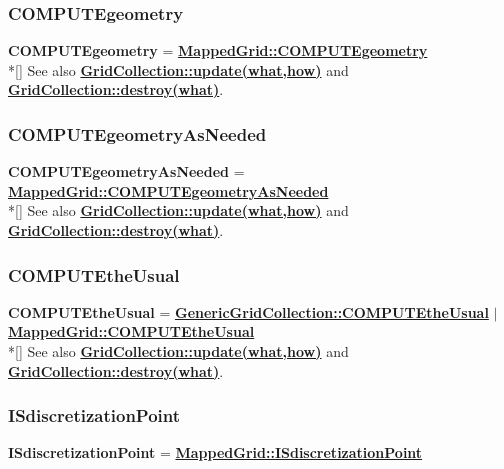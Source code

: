 \documentclass{article}
\begin{document}
  \subsubsection{COMPUTEgeometry}
  \label{GridCollection::COMPUTEgeometry}
    \textbf{COMPUTEgeometry} =
    {\bf{}\hyperref{MappedGrid::COMPUTEgeometry}{MappedGrid::COMPUTEgeometry \rm(\S}{)}{MappedGrid::COMPUTEgeometry}} \\*[\parskip]
    See also {\bf{}\hyperref{update(what,how)}{update(what,how) \rm(\S}{)}{GridCollection::update(what,how)}}
    and {\bf{}\hyperref{destroy(what)}{destroy(what) \rm(\S}{)}{GridCollection::destroy(what)}}.

  \subsubsection{COMPUTEgeometryAsNeeded}
  \label{GridCollection::COMPUTEgeometryAsNeeded}
    \textbf{COMPUTEgeometryAsNeeded} =
    {\bf{}\hyperref{MappedGrid::COMPUTEgeometryAsNeeded}{MappedGrid::COMPUTEgeometryAsNeeded \rm(\S}{)}{MappedGrid::COMPUTEgeometryAsNeeded}} \\*[\parskip]
    See also {\bf{}\hyperref{update(what,how)}{update(what,how) \rm(\S}{)}{GridCollection::update(what,how)}}
    and {\bf{}\hyperref{destroy(what)}{destroy(what) \rm(\S}{)}{GridCollection::destroy(what)}}.

  \subsubsection{COMPUTEtheUsual}
  \label{GridCollection::COMPUTEtheUsual}
    \textbf{COMPUTEtheUsual} =
           {\bf{}\hyperref{GenericGridCollection::COMPUTEtheUsual}{GenericGridCollection::COMPUTEtheUsual \rm(\S}{)}{GenericGridCollection::COMPUTEtheUsual}}
    $\mid$ {\bf{}\hyperref{MappedGrid::COMPUTEtheUsual}{MappedGrid::COMPUTEtheUsual \rm(\S}{)}{MappedGrid::COMPUTEtheUsual}} \\*[\parskip]
    See also {\bf{}\hyperref{update(what,how)}{update(what,how) \rm(\S}{)}{GridCollection::update(what,how)}}
    and {\bf{}\hyperref{destroy(what)}{destroy(what) \rm(\S}{)}{GridCollection::destroy(what)}}.

  \subsubsection{ISdiscretizationPoint}
  \label{GridCollection::ISdiscretizationPoint}
    \textbf{ISdiscretizationPoint} =
    {\bf{}\hyperref{MappedGrid::ISdiscretizationPoint}{MappedGrid::ISdiscretizationPoint \rm(\S}{)}{MappedGrid::ISdiscretizationPoint}}
\end{document}
